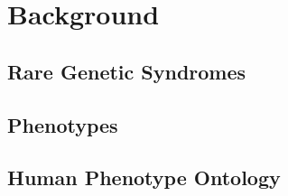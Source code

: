 \documentclass[../report.tex]{subfiles}
\begin{document}
    \chapter{Background}
    \lipsum[1-5]
    \section{Rare Genetic Syndromes}
    \section{Phenotypes}
    \section{Human Phenotype Ontology}
\end{document}
